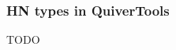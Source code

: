 \documentclass{beamer}
\begin{document}
\begin{frame}
    \frametitle{HN types in QuiverTools}
TODO
\end{frame}



\end{document}
